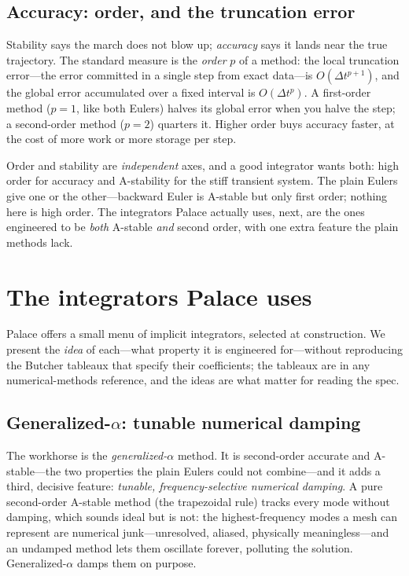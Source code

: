 \subsection{Accuracy: order, and the truncation error}

Stability says the march does not blow up; \emph{accuracy} says it lands near the
true trajectory. The standard measure is the \emph{order} $p$ of a method: the
local truncation error---the error committed in a single step from exact data---is
$O(\Delta t^{p+1})$, and the global error accumulated over a fixed interval is
$O(\Delta t^{p})$. A first-order method ($p=1$, like both Eulers) halves its global
error when you halve the step; a second-order method ($p=2$) quarters it. Higher
order buys accuracy faster, at the cost of more work or more storage per step.

Order and stability are \emph{independent} axes, and a good integrator wants both:
high order for accuracy and A-stability for the stiff transient system. The plain
Eulers give one or the other---backward Euler is A-stable but only first order;
nothing here is high order. The integrators Palace actually uses, next, are the
ones engineered to be \emph{both} A-stable \emph{and} second order, with one extra
feature the plain methods lack.

\section{The integrators Palace uses}
\label{sec:integrators}

Palace offers a small menu of implicit integrators, selected at construction. We
present the \emph{idea} of each---what property it is engineered for---without
reproducing the Butcher tableaux that specify their coefficients; the tableaux are
in any numerical-methods reference, and the ideas are what matter for reading the
spec.

\subsection{Generalized-$\alpha$: tunable numerical damping}

The workhorse is the \emph{generalized-$\alpha$} method. It is second-order
accurate and A-stable---the two properties the plain Eulers could not combine---and
it adds a third, decisive feature: \emph{tunable, frequency-selective numerical
damping}. A pure second-order A-stable method (the trapezoidal rule) tracks every
mode without damping, which sounds ideal but is not: the highest-frequency modes a
mesh can represent are numerical junk---unresolved, aliased, physically
meaningless---and an undamped method lets them oscillate forever, polluting the
solution. Generalized-$\alpha$ damps them on purpose.

